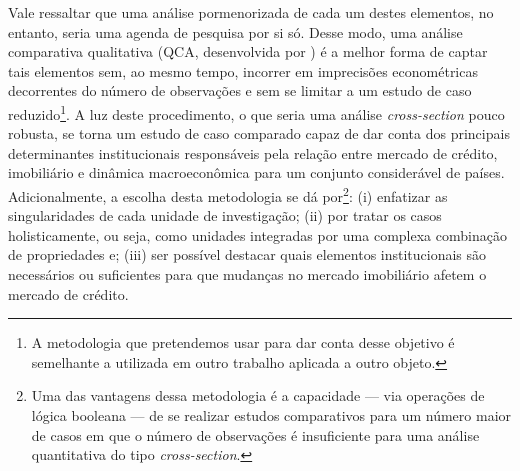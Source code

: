 Vale ressaltar que uma análise pormenorizada de cada um destes elementos, no entanto, seria uma agenda de pesquisa por si só. Desse modo, uma análise comparativa qualitativa (QCA, desenvolvida por \textcite{ragin_comparative_1989}) é a melhor forma de captar tais elementos sem, ao mesmo tempo, incorrer em imprecisões econométricas decorrentes do número de observações e sem se limitar a um estudo de caso reduzido\footnote{A metodologia que pretendemos usar para dar conta desse objetivo é semelhante a utilizada em outro trabalho \cite{petrini_comparacao_2019} aplicada a outro objeto.}. A luz deste procedimento, o que seria uma análise \textit{cross-section} pouco robusta, se torna um estudo de caso comparado capaz de dar conta dos principais determinantes institucionais responsáveis pela relação entre mercado de crédito, imobiliário e dinâmica macroeconômica para um conjunto considerável de países. Adicionalmente, a escolha desta metodologia se dá por\footnote{Uma das vantagens dessa metodologia é a capacidade --- via operações de lógica booleana --- de se realizar estudos comparativos para um número maior de casos em que o número de observações é insuficiente para uma análise quantitativa do tipo \textit{cross-section}.}: (i) enfatizar as singularidades de cada unidade de investigação; (ii) por tratar os casos holisticamente, ou seja, como unidades integradas por uma complexa combinação de propriedades e; (iii) ser possível destacar quais elementos institucionais são necessários ou suficientes para que mudanças no mercado imobiliário afetem o mercado de crédito.

